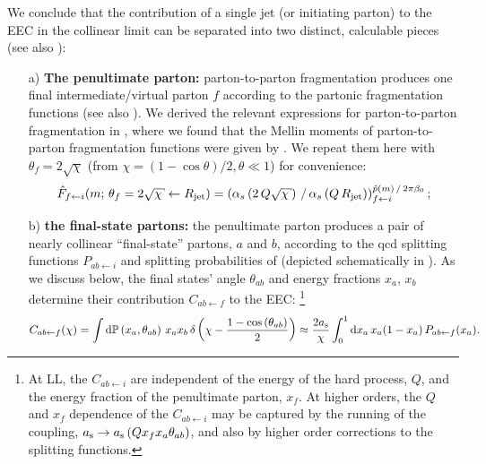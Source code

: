 We conclude that the contribution of a single jet (or initiating parton) to the EEC in the collinear limit can be separated into two distinct, calculable pieces (see also ):
\begin{enumerate}
    \item[a)]
    \textbf{The penultimate parton:}
    parton-to-parton fragmentation produces one final intermediate/virtual parton \(f\) according to the partonic fragmentation functions 
    (see also ).
    We derived the relevant expressions for parton-to-parton fragmentation in , where we found that the Mellin moments of parton-to-parton fragmentation functions were given by .
    We repeat them here with \(\theta_f = 2\sqrt{\chi}\) (from \(\chi = (1-\cos\theta)/2, \theta\ll1\)) for convenience:
    \begin{align*}
        \hat{F}_{f \leftarrow i} (m;\,
        \theta_f = 2 \sqrt{\chi}\leftarrow \Rjet)
        =
        \le(
            \alpha_s\le(2\,Q\sqrt{\chi}\ri)
            \, / \,
            \alpha_s\le(Q\,\Rjet\ri)
        \ri)
        ^
        {\hat{p}(m) \, / \, 2\pi\beta_0}
        _{f\leftarrow i}
        ;
    \end{align*}

    \item[b)]
    \textbf{the final-state partons:}
    the penultimate parton produces a pair of nearly collinear ``final-state'' partons, \(a\) and \(b\), according to the \gls{qcd} splitting functions \(P_{ab \leftarrow i}\) and splitting probabilities of 
    (depicted schematically in ).
    As we discuss below, the final states' angle \(\theta_{ab}\) and energy fractions \(x_a\), \(x_b\) determine their contribution \(C_{ab\leftarrow f}\) to the EEC:%
    \footnote{
        At LL, the \(C_{ab \leftarrow i}\) are independent of the energy of the hard process, \(Q\), and the energy fraction of the penultimate parton, \(x_f\).
        At higher orders, the \(Q\) and \(x_f\) dependence of the \(C_{ab \leftarrow i}\) may be captured by the running of the coupling, \(a_{\mathrm{s}} \to a_{\mathrm{s}}\left(Q x_f x_a \theta_{ab}\right)\), and also by higher order corrections to the splitting functions.
    }
    \begin{align}
        \label{eq:splitting_fn_contribution_to_eec}
        C_{ab\leftarrow f}(\chi)
        =
        \int \dd\mathbb{P}\le(x_a, \theta_{ab}\ri) \,
            x_a x_b
            \,
            \delta\le(\chi - \frac{1 - \cos\le(\theta_{ab}\ri)}{2}\ri)
        \approx
        \frac{2 \as}{\chi}
        \int_0^1 \dd x_a \, x_a (1-x_a) \,
        P_{ab \leftarrow f}(x_a)
        .
    \end{align}
\end{enumerate}

